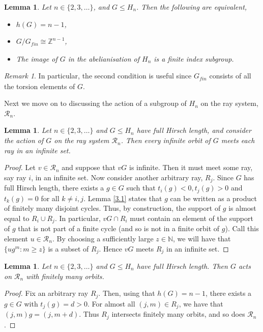 \documentclass[11pt,a4paper]{amsart}
\newtheorem{lemma}[theorem]{Lemma}
\theoremstyle{definition}
\theoremstyle{remark}
\newtheorem{remark}[theorem]{Remark}
\newcommand{\Z}{\mathbb Z}
\newcommand{\N}{\mathbb N}
\newcommand{\Ra}{\mathcal{R}}
\newcommand{\gfin}{G_{\textit{fin}}}
\begin{document}
\begin{lemma}\label{lem:structureofkfin}
Let $n\in \{2, 3,\ldots\}$, and $G \le H_n$. Then the following are equivalent,
\begin{itemize}
	\item $h(G)=n-1$, 
	\item $G/\gfin\cong\Z^{n-1}$, 
	\item The image of $G$ in the abelianisation of $H_n$ is a finite index subgroup. 
\end{itemize}
\end{lemma}

\begin{remark} \label{full point stabs} 
	In particular, the second condition is useful since $\gfin$ consists of all the torsion elements of $G$. 
\end{remark}

Next we move on to discussing the action of a subgroup of $H_n$ on the ray system, $\Ra_n$. 

\begin{lemma}
	\label{inforbs}
Let $n\in \{2, 3,\ldots\}$ and $G\le H_n$ have full Hirsch length, and consider the action of $G$ on the ray system $\Ra_n$. Then every infinite orbit of $G$ meets each ray in an infinite set.
\end{lemma}
\begin{proof}
Let $v \in \Ra_n$ and suppose that $vG$ is infinite. Then it must meet some ray, say ray $i$, in an infinite set. Now consider another arbitrary ray, $R_j$. Since $G$ has full Hirsch length, there exists a $g \in G$ such that $t_i(g) < 0, t_j(g) > 0$ and $t_k(g) = 0$ for all $k \neq i,j$. Lemma \ref{3.1} states that $g$ can be written as a product of finitely many disjoint cycles. Thus, by construction, the support of $g$ is almost equal to $R_i\cup R_j$. In particular, $vG\cap R_i$ must contain an element of the support of $g$ that is not part of a finite cycle (and so is not in a finite orbit of $g$). Call this element $u \in \Ra_n$. By choosing a sufficiently large $z\in\N$, we will have that $\{u g^m : m\ge z\}$ is a subset of $R_j$. Hence $vG$ meets $R_j$ in an infinite set.
\end{proof}

\begin{lemma}\label{4.4}
Let $n\in \{2, 3,\ldots\}$ and $G\le H_n$ have full Hirsch length. Then $G$ acts on $\Ra_n$ with finitely many orbits.
\end{lemma}
\begin{proof}
Fix an arbitrary ray $R_j$. Then, using that $h(G)=n-1$, there exists a $g\in G$ with $t_j(g)=d>0$. For almost all $(j, m) \in R_j$, we have that $(j, m)g=(j, m+d)$. Thus $R_j$ intersects finitely many orbits, and so does $\Ra_n$.
\end{proof}
\end{document}
